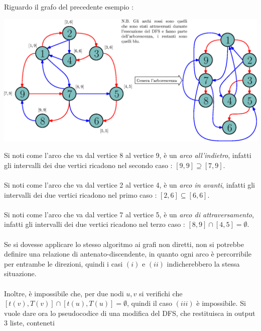 \documentclass[12pt, letterpaper]{article}
\newcommand{\acc}{\\\hphantom{}\\}
\begin{document}
Riguardo il grafo del precedente esempio : \begin{center}
    \includegraphics[width=1.05\textwidth ]{images/archiArborescenza.eps}
\end{center}
Si noti come l'arco che va dal vertice 8 al vertice 9, è un \textit{arco all'indietro}, infatti gli intervalli dei due
vertici ricadono nel secondo caso : \([9,9]\supseteq[7,9]\).\acc
Si noti come l'arco che va dal vertice 2 al vertice 4, è un \textit{arco in avanti}, infatti gli intervalli dei due
vertici ricadono nel primo caso : \([2,6]\subseteq[6,6]\).\acc
Si noti come l'arco che va dal vertice 7 al vertice 5, è un \textit{arco di attraversamento}, infatti gli intervalli dei due
vertici ricadono nel terzo caso : \([8,9]\cap[4,5]=\emptyset\).\acc
Se si dovesse applicare lo stesso algoritmo ai grafi non diretti, non si potrebbe definire una relazione di antenato-discendente,
in quanto ogni arco è percorribile per entrambe le direzioni, quindi i casi \((i)\) e \((ii)\) indicherebbero la stessa
situazione.\acc
Inoltre, è impossibile che, per due nodi \(u,v\) si verifichi che $[t(v),T(v)]\cap[t(u),T(u)]=\emptyset$, quindi
il caso \((iii)\) è impossibile. Si vuole dare ora lo pseudocodice di una modifica del DFS, che restituisca in output 3 liste, conteneti
\end{document}
